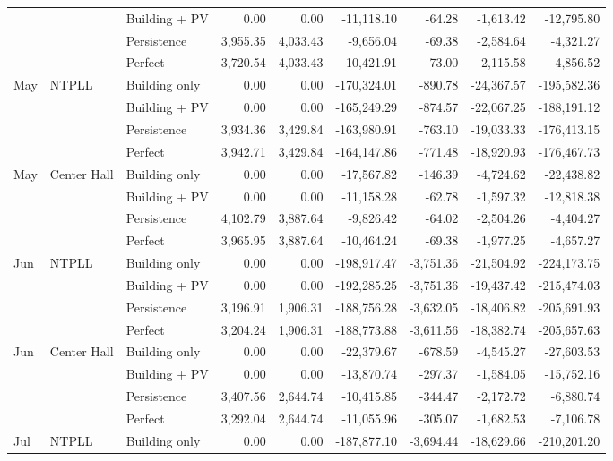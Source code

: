 \documentclass[final,5p,times]{elsarticle}
\begin{document}
\begin{table}[!t]
\begin{tabular}{@{}lllrrrrrr@{}}
 &  & Building + PV & 0.00 & 0.00 & -11,118.10 & -64.28 & -1,613.42 & -12,795.80 \\
 &  & Persistence & 3,955.35 & 4,033.43 & -9,656.04 & -69.38 & -2,584.64 & -4,321.27 \\
 &  & Perfect & 3,720.54 & 4,033.43 & -10,421.91 & -73.00 & -2,115.58 & -4,856.52 \\
\addlinespace
May & NTPLL & Building only & 0.00 & 0.00 & -170,324.01 & -890.78 & -24,367.57 & -195,582.36 \\
 &  & Building + PV & 0.00 & 0.00 & -165,249.29 & -874.57 & -22,067.25 & -188,191.12 \\
 &  & Persistence & 3,934.36 & 3,429.84 & -163,980.91 & -763.10 & -19,033.33 & -176,413.15 \\
 &  & Perfect & 3,942.71 & 3,429.84 & -164,147.86 & -771.48 & -18,920.93 & -176,467.73 \\
\addlinespace
May & Center Hall & Building only & 0.00 & 0.00 & -17,567.82 & -146.39 & -4,724.62 & -22,438.82 \\
 &  & Building + PV & 0.00 & 0.00 & -11,158.28 & -62.78 & -1,597.32 & -12,818.38 \\
 &  & Persistence & 4,102.79 & 3,887.64 & -9,826.42 & -64.02 & -2,504.26 & -4,404.27 \\
 &  & Perfect & 3,965.95 & 3,887.64 & -10,464.24 & -69.38 & -1,977.25 & -4,657.27 \\
\addlinespace
Jun & NTPLL & Building only & 0.00 & 0.00 & -198,917.47 & -3,751.36 & -21,504.92 & -224,173.75 \\
 &  & Building + PV & 0.00 & 0.00 & -192,285.25 & -3,751.36 & -19,437.42 & -215,474.03 \\
 &  & Persistence & 3,196.91 & 1,906.31 & -188,756.28 & -3,632.05 & -18,406.82 & -205,691.93 \\
 &  & Perfect & 3,204.24 & 1,906.31 & -188,773.88 & -3,611.56 & -18,382.74 & -205,657.63 \\
\addlinespace
Jun & Center Hall & Building only & 0.00 & 0.00 & -22,379.67 & -678.59 & -4,545.27 & -27,603.53 \\
 &  & Building + PV & 0.00 & 0.00 & -13,870.74 & -297.37 & -1,584.05 & -15,752.16 \\
 &  & Persistence & 3,407.56 & 2,644.74 & -10,415.85 & -344.47 & -2,172.72 & -6,880.74 \\
 &  & Perfect & 3,292.04 & 2,644.74 & -11,055.96 & -305.07 & -1,682.53 & -7,106.78 \\
\addlinespace
Jul & NTPLL & Building only & 0.00 & 0.00 & -187,877.10 & -3,694.44 & -18,629.66 & -210,201.20 \\

\end{tabular}
\end{table}
\end{document}
